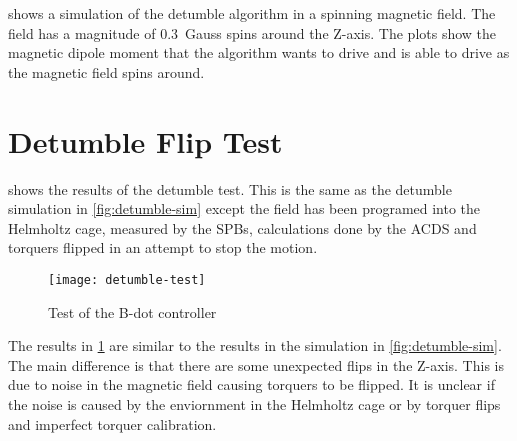 shows a simulation of the detumble algorithm in a spinning magnetic field. The field has a magnitude of 0.3~Gauss spins around the Z-axis. The plots show the magnetic dipole moment that the algorithm wants to drive and is able to drive as the magnetic field spins around.


\section{Detumble Flip Test}

 shows the results of the detumble test. This is the same as the detumble simulation in \cref{fig:detumble-sim} except the field has been programed into the Helmholtz cage, measured by the \acp{SPB}, calculations done by the \ac{ACDS} and torquers flipped in an attempt to stop the motion.

\begin{figure}[!ht]
    \centering
    \texttt{[image: detumble-test]}
  \caption{Test of the B-dot controller}
    \label{fig:detumble-test}
\end{figure}

The results in \cref{fig:detumble-test} are similar to the results in the simulation in \cref{fig:detumble-sim}. The main difference is that there are some unexpected flips in the Z-axis. This is due to noise in the magnetic field causing torquers to be flipped. It is unclear if the noise is caused by the enviornment in the Helmholtz cage or by torquer flips and imperfect torquer calibration.


